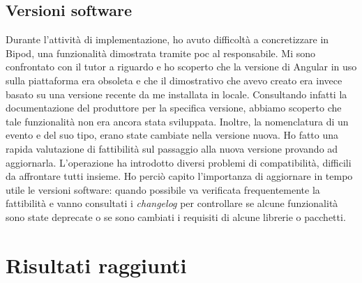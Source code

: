 \subsection{Versioni software}
Durante l'attività di implementazione, ho avuto difficoltà a concretizzare in Bipod, una funzionalità dimostrata tramite \acrshort{poc} al responsabile. Mi sono confrontato con il tutor a riguardo e ho scoperto che la versione di Angular in uso sulla piattaforma era obsoleta e che il dimostrativo che avevo creato era invece basato su una versione recente da me installata in locale. Consultando infatti la documentazione del produttore per la specifica versione, abbiamo scoperto che tale funzionalità non era ancora stata sviluppata. Inoltre, la nomenclatura di un evento e del suo tipo, erano state cambiate nella versione nuova.
Ho fatto una rapida valutazione di fattibilità sul passaggio alla nuova versione provando ad aggiornarla. L'operazione ha introdotto diversi problemi di compatibilità, difficili da affrontare tutti insieme. Ho perciò capito l'importanza di aggiornare in tempo utile le versioni software: quando possibile va verificata frequentemente la fattibilità e vanno consultati i \textit{changelog} per controllare se alcune funzionalità sono state deprecate o se sono cambiati i requisiti di alcune librerie o pacchetti.
\section{Risultati raggiunti}
